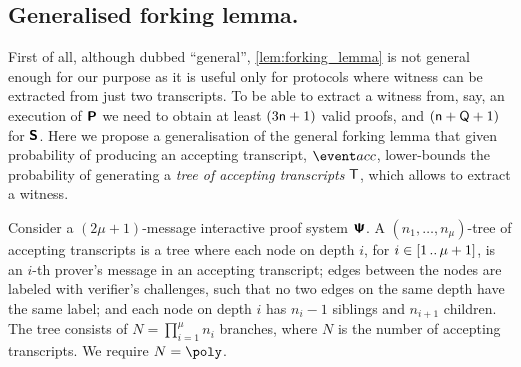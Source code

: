 \documentclass[runningheads,11pt]{llncs}
\begin{document}
\subsection{Generalised forking lemma.}
First of all, although dubbed ``general'', \cref{lem:forking_lemma} is not
general enough for our purpose as it is useful only for protocols where witness
can be extracted from just two transcripts. To be able to extract a witness
from, say, an execution of $\bm{\mathsf{P}}$ we need to obtain at least
$(3 \mathsf{n} + 1)$ valid proofs, and $(\mathsf{n} + \mathsf{Q} + 1)$ for $\bm{\mathsf{S}}$. Here we
propose a generalisation of the general forking lemma that given probability of
producing an accepting transcript, $\accProb$, lower-bounds the probability of
generating a \emph{tree of accepting transcripts} $\mathsf{T}$, which allows to
extract a witness.

\begin{definition}
	\label{def:tree_of_accepting_transcripts}
	Consider a $(2\mu + 1)$-message interactive proof system $\bm{\mathsf{\Psi}}$. A $(n_1,
  \ldots, n_\mu)$-tree of accepting transcripts is a tree where each node on
  depth $i$, for $i \in [1 \, .. \, \mu + 1]$, is an $i$-th prover's message in an
  accepting transcript; edges between the nodes are labeled with verifier's
  challenges, such that no two edges on the same depth have the same
  label; and each node on depth $i$ has $n_{i} - 1$ siblings and $n_{i +
    1}$ children. The tree consists of $N = \prod_{i = 1}^\mu n_i$
  branches, where $N$ is the number of accepting transcripts. We require $N = \poly$.
\end{definition}
\end{document}
